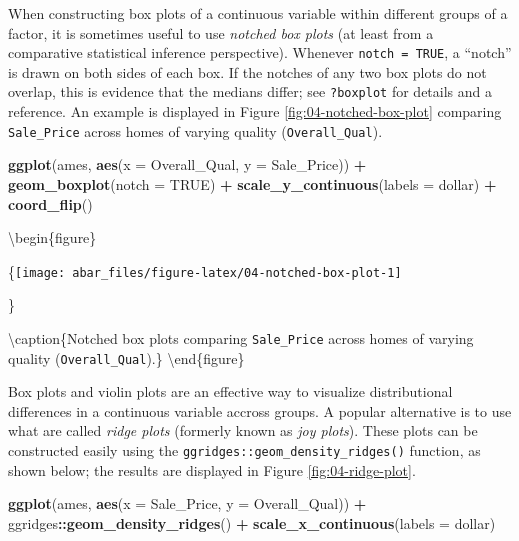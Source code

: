 \documentclass[]{book}
\newenvironment{Shaded}{\begin{snugshade}}{\end{snugshade}}
\newcommand{\DataTypeTok}[1]{\textcolor[rgb]{0.13,0.29,0.53}{#1}}
\newcommand{\KeywordTok}[1]{\textcolor[rgb]{0.13,0.29,0.53}{\textbf{#1}}}
\newcommand{\NormalTok}[1]{#1}
\newcommand{\OperatorTok}[1]{\textcolor[rgb]{0.81,0.36,0.00}{\textbf{#1}}}
\newcommand{\OtherTok}[1]{\textcolor[rgb]{0.56,0.35,0.01}{#1}}
\newcommand{\StringTok}[1]{\textcolor[rgb]{0.31,0.60,0.02}{#1}}
\theoremstyle{definition}
\theoremstyle{definition}
\theoremstyle{definition}
\theoremstyle{remark}
\let\BeginKnitrBlock\begin \let\EndKnitrBlock\end
\begin{document}
\BeginKnitrBlock{tip}
When constructing box plots of a continuous variable within different
groups of a factor, it is sometimes useful to use \emph{notched box
plots} (at least from a comparative statistical inference perspective).
Whenever \texttt{notch\ =\ TRUE}, a ``notch'' is drawn on both sides of
each box. If the notches of any two box plots do not overlap, this is
evidence that the medians differ; see \texttt{?boxplot} for details and
a reference. An example is displayed in Figure
\ref{fig:04-notched-box-plot} comparing \texttt{Sale\_Price} across
homes of varying quality (\texttt{Overall\_Qual}).
\EndKnitrBlock{tip}

\begin{Shaded}
\begin{Highlighting}[]
\KeywordTok{ggplot}\NormalTok{(ames, }\KeywordTok{aes}\NormalTok{(}\DataTypeTok{x =}\NormalTok{ Overall_Qual, }\DataTypeTok{y =}\NormalTok{ Sale_Price)) }\OperatorTok{+}
\StringTok{  }\KeywordTok{geom_boxplot}\NormalTok{(}\DataTypeTok{notch =} \OtherTok{TRUE}\NormalTok{) }\OperatorTok{+}
\StringTok{  }\KeywordTok{scale_y_continuous}\NormalTok{(}\DataTypeTok{labels =}\NormalTok{ dollar) }\OperatorTok{+}
\StringTok{  }\KeywordTok{coord_flip}\NormalTok{()}
\end{Highlighting}
\end{Shaded}

\textbackslash{}begin\{figure\}

\{\centering \texttt{[image: abar\_files/figure-latex/04-notched-box-plot-1]}

\}

\textbackslash{}caption\{Notched box plots comparing
\texttt{Sale\_Price} across homes of varying quality
(\texttt{Overall\_Qual}).\}\label{fig:04-notched-box-plot}
\textbackslash{}end\{figure\}

Box plots and violin plots are an effective way to visualize
distributional differences in a continuous variable accross groups. A
popular alternative is to use what are called \emph{ridge plots}
(formerly known as \emph{joy plots}). These plots can be constructed
easily using the \texttt{ggridges::geom\_density\_ridges()} function, as
shown below; the results are displayed in Figure
\ref{fig:04-ridge-plot}.

\begin{Shaded}
\begin{Highlighting}[]
\KeywordTok{ggplot}\NormalTok{(ames, }\KeywordTok{aes}\NormalTok{(}\DataTypeTok{x =}\NormalTok{ Sale_Price, }\DataTypeTok{y =}\NormalTok{ Overall_Qual)) }\OperatorTok{+}\StringTok{ }
\StringTok{  }\NormalTok{ggridges}\OperatorTok{::}\KeywordTok{geom_density_ridges}\NormalTok{() }\OperatorTok{+}
\StringTok{  }\KeywordTok{scale_x_continuous}\NormalTok{(}\DataTypeTok{labels =}\NormalTok{ dollar)}
\end{Highlighting}
\end{Shaded}
\end{document}
